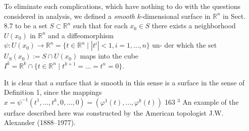 \noindent
To eliminate such complications, which have nothing to do with the questions
considered in analysis, we defined a \textit{smooth} $k$-dimensional surface in $\mathbb{R}^n$ in Sect. 8.7
to be a set $S \subset \mathbb{R}^n$ such that for each $x_0 \in S$ there exists a neighborhood $U(x_0)$
in $\mathbb{R}^n$ and a diffeomorphism $\psi : U(x_0) \to \mathbb{R}^n = \{t \in \mathbb{R}^n \mid |t^i| < 1, i = 1, \dots, n\}$ un-
der which the set $U_S(x_0) := S \cap U(x_0)$ maps into the cube $I^k = \mathbb{R}^k \cap \{t \in \mathbb{R}^n \mid
t^{k+1} = \dots = t^n = 0\}$.

\noindent
It is clear that a surface that is smooth in this sense is a surface in the sense
of Definition 1, since the mappings $x = \psi^{-1}(t^1, \dots, t^k, 0, \dots, 0) = (\varphi^1(t), \dots, \varphi^k(t))$
\hfill 163
$^3$ An example of the surface described here was constructed by the American topologist
J.W. Alexander (1888–1977).